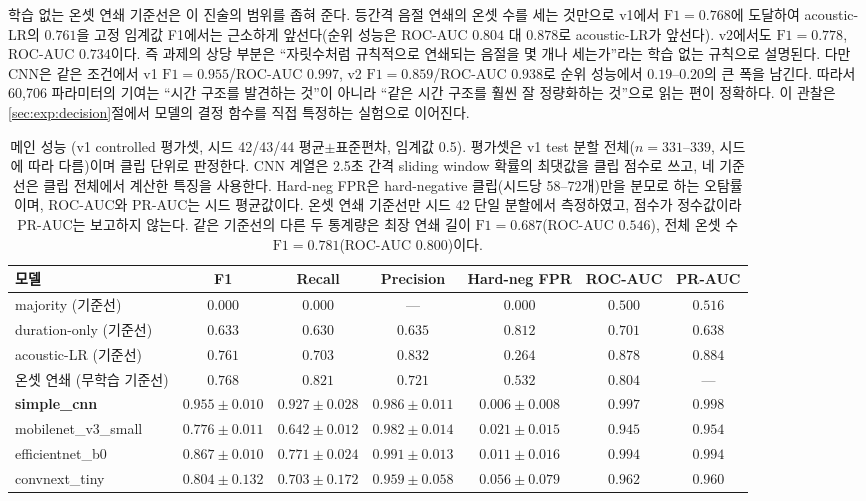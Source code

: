 \documentclass[11pt]{article}
\begin{document}
학습 없는 온셋 연쇄 기준선은 이 진술의 범위를 좁혀 준다. 등간격 음절 연쇄의 온셋 수를 세는
것만으로 v1에서 $\text{F1}=0.768$에 도달하여 acoustic-LR의 $0.761$을 고정 임계값 F1에서는
근소하게 앞선다(순위 성능은 ROC-AUC $0.804$ 대 $0.878$로 acoustic-LR가 앞선다). v2에서도
$\text{F1}=0.778$, ROC-AUC $0.734$이다. 즉 과제의 상당 부분은 ``자릿수처럼 규칙적으로
연쇄되는 음절을 몇 개나 세는가''라는 학습 없는 규칙으로 설명된다. 다만 CNN은 같은 조건에서
v1 $\text{F1}=0.955$/ROC-AUC $0.997$, v2 $\text{F1}=0.859$/ROC-AUC $0.938$로 순위 성능에서
$0.19$--$0.20$의 큰 폭을 남긴다. 따라서 60{,}706 파라미터의 기여는 ``시간 구조를 발견하는 것''이
아니라 ``같은 시간 구조를 훨씬 잘 정량화하는 것''으로 읽는 편이 정확하다. 이 관찰은
\ref{sec:exp:decision}절에서 모델의 결정 함수를 직접 특정하는 실험으로 이어진다.

\begin{table}[!htbp]
\centering
\caption{메인 성능 (v1 controlled 평가셋, 시드 42/43/44 평균$\pm$표준편차, 임계값 0.5).
평가셋은 v1 test 분할 전체($n=331$--$339$, 시드에 따라 다름)이며 클립 단위로 판정한다.
CNN 계열은 2.5초 간격 sliding window 확률의 최댓값을 클립 점수로 쓰고, 네 기준선은 클립
전체에서 계산한 특징을 사용한다. Hard-neg FPR은 hard-negative 클립(시드당 58--72개)만을
분모로 하는 오탐률이며, ROC-AUC와 PR-AUC는 시드 평균값이다. 온셋 연쇄 기준선만 시드 42
단일 분할에서 측정하였고, 점수가 정수값이라 PR-AUC는 보고하지 않는다. 같은 기준선의 다른
두 통계량은 최장 연쇄 길이 $\text{F1}=0.687$(ROC-AUC $0.546$), 전체 온셋 수
$\text{F1}=0.781$(ROC-AUC $0.800$)이다.}
\label{tab:main}
\footnotesize
\setlength{\tabcolsep}{4pt}
\begin{tabular}{lcccccc}
\toprule
모델 & F1 & Recall & Precision & Hard-neg FPR & ROC-AUC & PR-AUC \\
\midrule
majority (기준선)      & $0.000$ & $0.000$ & --- & $0.000$ & $0.500$ & $0.516$ \\
duration-only (기준선) & $0.633$ & $0.630$ & $0.635$ & $0.812$ & $0.701$ & $0.638$ \\
acoustic-LR (기준선)   & $0.761$ & $0.703$ & $0.832$ & $0.264$ & $0.878$ & $0.884$ \\
온셋 연쇄 (무학습 기준선) & $0.768$ & $0.821$ & $0.721$ & $0.532$ & $0.804$ & --- \\
\textbf{simple\_cnn}   & $\mathbf{0.955\pm0.010}$ & $\mathbf{0.927\pm0.028}$ & $0.986\pm0.011$ & $\mathbf{0.006\pm0.008}$ & $\mathbf{0.997}$ & $\mathbf{0.998}$ \\
mobilenet\_v3\_small   & $0.776\pm0.011$ & $0.642\pm0.012$ & $0.982\pm0.014$ & $0.021\pm0.015$ & $0.945$ & $0.954$ \\
efficientnet\_b0       & $0.867\pm0.010$ & $0.771\pm0.024$ & $0.991\pm0.013$ & $0.011\pm0.016$ & $0.994$ & $0.994$ \\
convnext\_tiny         & $0.804\pm0.132$ & $0.703\pm0.172$ & $0.959\pm0.058$ & $0.056\pm0.079$ & $0.962$ & $0.960$ \\
\bottomrule
\end{tabular}
\end{table}
\end{document}

